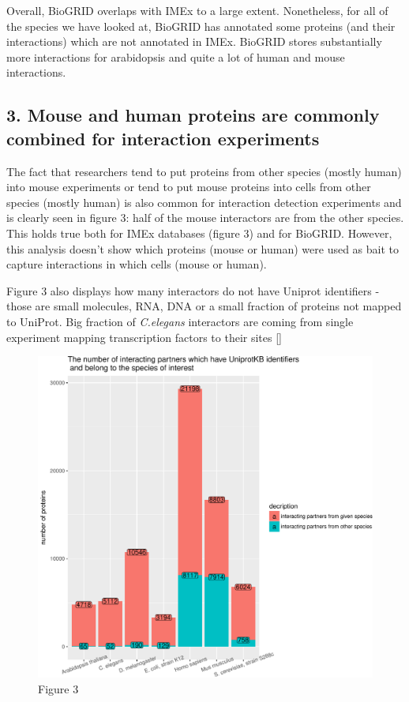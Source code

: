 \documentclass[]{article}
\begin{document}
Overall, BioGRID overlaps with IMEx to a large extent. Nonetheless, for
all of the species we have looked at, BioGRID has annotated some
proteins (and their interactions) which are not annotated in IMEx.
BioGRID stores substantially more interactions for arabidopsis and quite
a lot of human and mouse interactions.

\subsection{3. Mouse and human proteins are commonly combined for
interaction
experiments}\label{mouse-and-human-proteins-are-commonly-combined-for-interaction-experiments}

The fact that researchers tend to put proteins from other species
(mostly human) into mouse experiments or tend to put mouse proteins into
cells from other species (mostly human) is also common for interaction
detection experiments and is clearly seen in figure 3: half of the mouse
interactors are from the other species. This holds true both for IMEx
databases (figure 3) and for BioGRID. However, this analysis doesn't
show which proteins (mouse or human) were used as bait to capture
interactions in which cells (mouse or human).

Figure 3 also displays how many interactors do not have Uniprot
identifiers - those are small molecules, RNA, DNA or a small fraction of
proteins not mapped to UniProt. Big fraction of \emph{C.elegans}
interactors are coming from single experiment mapping transcription
factors to their sites {[}{]}

\begin{figure}[htbp]
\centering
\includegraphics{final_report_files/figure-latex/IMEx_vs_Uniprot_N_Uniprot_Species-1.pdf}
\caption{Figure 3}
\end{figure}
\end{document}
